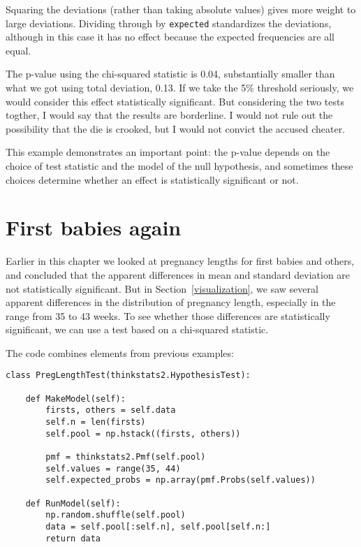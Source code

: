 Squaring the deviations (rather than taking absolute values) gives
more weight to large deviations.  Dividing through by {\tt expected}
standardizes the deviations, although in this case it has no effect
because the expected frequencies are all equal.

The p-value using the chi-squared statistic is 0.04,
substantially smaller than what we got using total deviation, 0.13.
If we take the 5\% threshold seriously, we would consider this effect
statistically significant.  But considering the two tests togther, I
would say that the results are borderline.  I would not rule out the
possibility that the die is crooked, but I would not convict the
accused cheater.
   

This example demonstrates an important point: the p-value depends
on the choice of test statistic and the model of the null hypothesis,
and sometimes these choices determine whether an effect is
statistically significant or not.


\section{First babies again}

Earlier in this chapter we looked at pregnancy lengths for first
babies and others, and concluded that the apparent differences in
mean and standard deviation are not statistically significant.  But in
Section~\ref{visualization}, we saw several apparent differences
in the distribution of pregnancy length, especially in the range from
35 to 43 weeks.  To see whether those differences are statistically
significant, we can use a test based on a chi-squared statistic.
 

The code combines elements from previous examples:

\begin{verbatim}
class PregLengthTest(thinkstats2.HypothesisTest):

    def MakeModel(self):
        firsts, others = self.data
        self.n = len(firsts)
        self.pool = np.hstack((firsts, others))

        pmf = thinkstats2.Pmf(self.pool)
        self.values = range(35, 44)
        self.expected_probs = np.array(pmf.Probs(self.values))

    def RunModel(self):
        np.random.shuffle(self.pool)
        data = self.pool[:self.n], self.pool[self.n:]
        return data
\end{verbatim}

